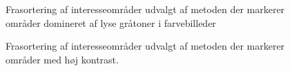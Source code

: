 \begin{figure}[htbp]
  \centering
  \begin{minipage}[b]{5 cm}
  \end{minipage}
  \begin{minipage}[b]{5 cm}
  \end{minipage}
  \caption{Frasortering af interesseområder udvalgt af metoden der markerer områder domineret af lyse gråtoner i farvebilleder}
  \label{fig:DetectSameness-cleanup}
\end{figure}

\begin{figure}[htbp]
  \centering
  \begin{minipage}[b]{5 cm}
  \end{minipage}
  \begin{minipage}[b]{5 cm}
  \end{minipage}
  \caption{Frasortering af interesseområder udvalgt af metoden der markerer områder med høj kontrast.}
   \label{fig:DetectContrastAvg-cleanup}
\end{figure}

